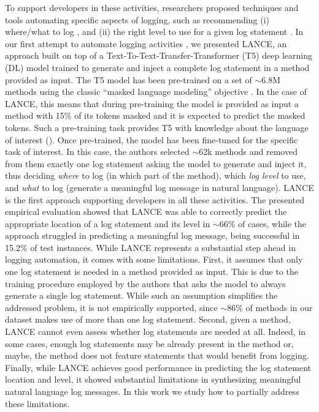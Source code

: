 To support developers in these activities, researchers proposed techniques and tools automating specific aspects of logging, such as recommending (i) where/what to log \cite{yuan2010sherlog,jia2018smartlog,li2018studying,li2020shall}, and (ii) the right level to use for a given log statement \cite{yuan2012characterizing,oliner2012advances,li2017log,li2020qualitative,li2021deeplv}. In our first attempt to automate logging activities \cite{mastropaolo2022using}, we presented LANCE, an approach built on top of a Text-To-Text-Transfer-Transformer (T5) deep learning (DL) model \cite{raffel2019exploring} trained to generate and inject a complete log statement in a \java method provided as input. The T5 model has been pre-trained on a set of $\sim$6.8M \java methods using the classic ``masked language modeling'' objective \cite{raffel2019exploring}. In the case of LANCE, this means that during pre-training the model is provided as input a \java method with 15\% of its tokens masked and it is expected to predict the masked tokens. Such a pre-training task provides T5 with knowledge about the language of interest (\ie \java). Once pre-trained, the model has been fine-tuned for the specific task of interest. In this case, the authors selected $\sim$62k \java methods and removed from them exactly one log statement asking the model to generate and inject it, thus deciding \emph{where} to log (\ie in which part of the method), which \emph{log level} to use, and \emph{what} to log (\ie generate a meaningful log message in natural language). LANCE is the first approach supporting developers in all these activities. The presented empirical evaluation showed that LANCE was able to correctly predict the appropriate location of a log statement and its level in $\sim$66\% of cases, while the approach struggled in predicting a meaningful log message, being successful in 15.2\% of test instances. While LANCE represents a substantial step ahead in logging automation, it comes with some limitations. First, it assumes that only one log statement is needed in a \java method provided as input. This is due to the training procedure employed by the authors that asks the model to always generate a single log statement. While such an assumption simplifies the addressed problem, it is not empirically supported, since $\sim$86\% of \java methods in our dataset makes use of more than one log statement. Second, given a \java method, LANCE cannot even assess whether log statements are needed at all. 
%
%
Indeed, in some cases, enough log statements may be already present in the method or, maybe, the method does not feature statements that would benefit from logging. Finally,  while LANCE achieves good performance in predicting the log statement location and level, it showed substantial limitations in synthesizing meaningful natural language log messages. In this work we study how to partially address these limitations.


